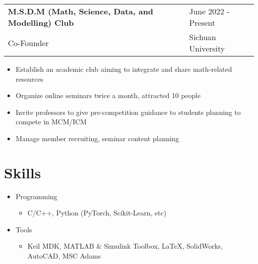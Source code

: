 \documentclass[letter,12pt]{article}
\begin{document}
\begin{tabularx}{\linewidth}{@{}l X@{}}
\large \textbf{M.S.D.M (Math, Science, Data, and Modelling) Club} & \hfill {June 2022 - Present} \\
\normalsize{Co-Founder} & \hfill \small{Sichuan University} \\
\end{tabularx}

\begin{itemize}[
    rightmargin=2cm
]
    \setlength{\itemsep}{1pt}
    \setlength{\parskip}{0pt}
    \setlength{\parsep}{0pt}
    \item{\small Establish an academic club aiming to integrate and share math-related resources}
    \item{\small Organize online seminars twice a month, attracted 10 people}
    \item{\small Invite professors to give pre-competition guidance to students planning to compete in MCM/ICM}
    \item{\small Manage member recruiting, seminar content planning}
\end{itemize}

\section{Skills}
\begin{itemize}[nosep,after=\strut, leftmargin=1em, itemsep=3pt]
    \item{Programming}
    \begin{itemize}
        \item C/C++, Python (PyTorch, Scikit-Learn, etc) 
    \end{itemize}
    \item{Tools}
    \begin{itemize}
        \item Keil MDK, MATLAB \& Simulink Toolbox, LaTeX, SolidWorks, AutoCAD, MSC Adams 
    \end{itemize}
\end{itemize}


\begin{comment}

\end{comment}
\end{document}

